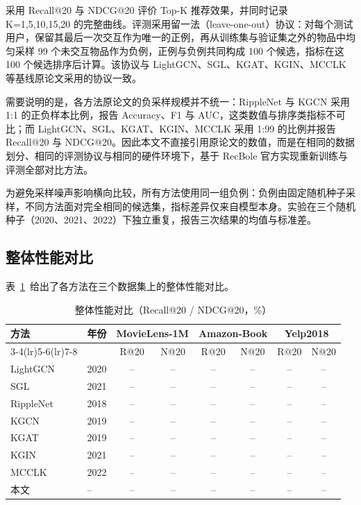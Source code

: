 采用 Recall@20 与 NDCG@20 评价 Top-K 推荐效果，并同时记录 K=1,5,10,15,20 的完整曲线。评测采用留一法（leave-one-out）协议：对每个测试用户，保留其最后一次交互作为唯一的正例，再从训练集与验证集之外的物品中均匀采样 99 个未交互物品作为负例，正例与负例共同构成 100 个候选，指标在这 100 个候选排序后计算。该协议与 LightGCN、SGL、KGAT、KGIN、MCCLK 等基线原论文采用的协议一致。

需要说明的是，各方法原论文的负采样规模并不统一：RippleNet 与 KGCN 采用 1:1 的正负样本比例，报告 Accuracy、F1 与 AUC，这类数值与排序类指标不可比；而 LightGCN、SGL、KGAT、KGIN、MCCLK 采用 1:99 的比例并报告 Recall@20 与 NDCG@20。因此本文不直接引用原论文的数值，而是在相同的数据划分、相同的评测协议与相同的硬件环境下，基于 RecBole 官方实现重新训练与评测全部对比方法。

为避免采样噪声影响横向比较，所有方法使用同一组负例：负例由固定随机种子采样，不同方法面对完全相同的候选集，指标差异仅来自模型本身。实验在三个随机种子（2020、2021、2022）下独立重复，报告三次结果的均值与标准差。

\subsection{整体性能对比}
\label{subsec:graph-overall}

表~\ref{tab:graph-overall}~给出了各方法在三个数据集上的整体性能对比。

\begin{table}[htbp]
  \centering
  \small
  \setlength{\tabcolsep}{4pt}
  \caption{整体性能对比（Recall@20 / NDCG@20，\%）}
  \label{tab:graph-overall}
  \begin{tabular}{llcccccc}
    \toprule
    \multirow{2}{*}{方法} & \multirow{2}{*}{年份} & \multicolumn{2}{c}{MovieLens-1M} & \multicolumn{2}{c}{Amazon-Book} & \multicolumn{2}{c}{Yelp2018} \\
    \cmidrule(lr){3-4}\cmidrule(lr){5-6}\cmidrule(lr){7-8}
     & & R@20 & N@20 & R@20 & N@20 & R@20 & N@20 \\
    \midrule
    LightGCN  & 2020 & -- & -- & -- & -- & -- & -- \\
    SGL       & 2021 & -- & -- & -- & -- & -- & -- \\
    RippleNet & 2018 & -- & -- & -- & -- & -- & -- \\
    KGCN      & 2019 & -- & -- & -- & -- & -- & -- \\
    KGAT      & 2019 & -- & -- & -- & -- & -- & -- \\
    KGIN      & 2021 & -- & -- & -- & -- & -- & -- \\
    MCCLK     & 2022 & -- & -- & -- & -- & -- & -- \\
    \midrule
    本文      & --   & -- & -- & -- & -- & -- & -- \\
    \bottomrule
  \end{tabular}
\end{table}

